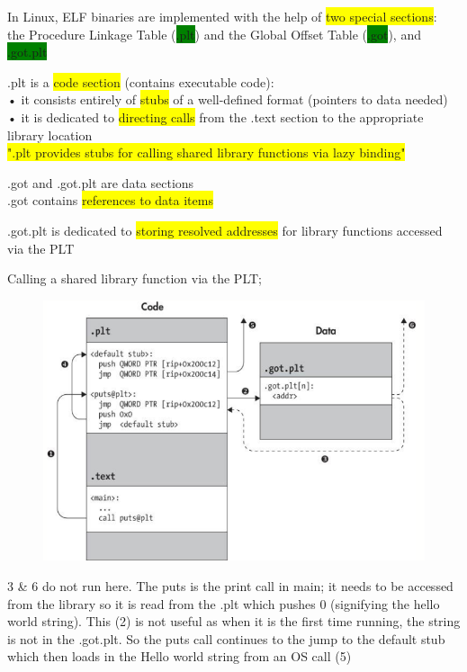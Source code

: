 \documentclass[]{project_plan}
\begin{document}
In Linux, ELF binaries are implemented with the help of \colorbox{yellow}{two special sections}:\\
the Procedure Linkage Table (\colorbox{green}{.plt}) and the Global Offset Table (\colorbox{green}{.got}), and \colorbox{green}{.got.plt}

.plt is a \colorbox{yellow}{code section} (contains executable code):\\
• it consists entirely of \colorbox{yellow}{stubs} of a well-defined format (pointers to data needed)\\
• it is dedicated to \colorbox{yellow}{directing calls} from the .text section to the appropriate library location\\

\colorbox{yellow}{".plt provides stubs for calling shared library functions via lazy binding"}

.got and .got.plt are data sections\\
.got contains \colorbox{yellow}{references to data items}

.got.plt is dedicated to \colorbox{yellow}{storing resolved addresses} for library functions
accessed via the PLT

Calling a shared library function via the PLT;
\begin{figure}[H]
  \centering
  \includegraphics[width=.8\linewidth]{calling_via_plt.png}
\end{figure}

3 \& 6 do not run here. The puts is the print call in main; it needs to be accessed
from the library so it is read from the .plt which pushes 0 (signifying the hello world string).
This (2) is not useful as when it is the first time running, the string is not in the .got.plt.
So the puts call continues to the jump to the default stub which then loads in the Hello world
string from an OS call (5)
\end{document}
